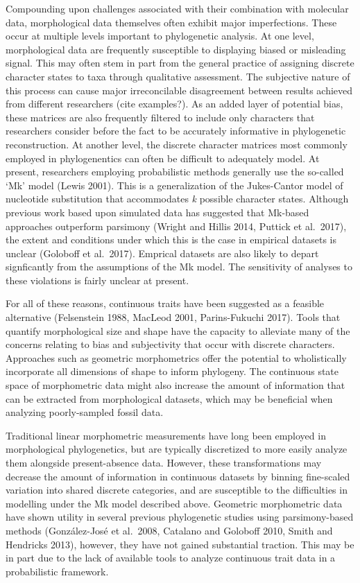 \documentclass[12pt]{article}
\begin{document}
Compounding upon challenges associated with their combination with
molecular data, morphological data themselves often exhibit major
imperfections. These occur at multiple levels important to phylogenetic
analysis. At one level, morphological data are frequently susceptible to
displaying biased or misleading signal. This may often stem in part from
the general practice of assigning discrete character states to taxa
through qualitative assessment. The subjective nature of this process
can cause major irreconcilable disagreement between results achieved
from different researchers (cite examples?). As an added layer of
potential bias, these matrices are also frequently filtered to include
only characters that researchers consider before the fact to be
accurately informative in phylogenetic reconstruction. At another level,
the discrete character matrices most commonly employed in phylogenentics
can often be difficult to adequately model. At present, researchers
employing probabilistic methods generally use the so-called `Mk' model
(Lewis 2001). This is a generalization of the Jukes-Cantor model of
nucleotide substitution that accommodates \emph{k} possible character
states. Although previous work based upon simulated data has suggested
that Mk-based approaches outperform parsimony (Wright and Hillis 2014,
Puttick et al.~2017), the extent and conditions under which this is the
case in empirical datasets is unclear (Goloboff et al.~2017). Emprical
datasets are also likely to depart signficantly from the assumptions of
the Mk model. The sensitivity of analyses to these violations is fairly
unclear at present.

For all of these reasons, continuous traits have been suggested as a
feasible alternative (Felsenstein 1988, MacLeod 2001, Parins-Fukuchi
2017). Tools that quantify morphological size and shape have the
capacity to alleviate many of the concerns relating to bias and
subjectivity that occur with discrete characters. Approaches such as
geometric morphometrics offer the potential to wholistically incorporate
all dimensions of shape to inform phylogeny. The continuous state space
of morphometric data might also increase the amount of information that
can be extracted from morphological datasets, which may be beneficial
when analyzing poorly-sampled fossil data.

Traditional linear morphometric measurements have long been employed in
morphological phylogenetics, but are typically discretized to more
easily analyze them alongside present-absence data. However, these
transformations may decrease the amount of information in continuous
datasets by binning fine-scaled variation into shared discrete
categories, and are susceptible to the difficulties in modelling under
the Mk model described above. Geometric morphometric data have shown
utility in several previous phylogenetic studies using parsimony-based
methods (González-José et al.~2008, Catalano and Goloboff 2010, Smith
and Hendricks 2013), however, they have not gained substantial traction.
This may be in part due to the lack of available tools to analyze
continuous trait data in a probabilistic framework.
\end{document}

